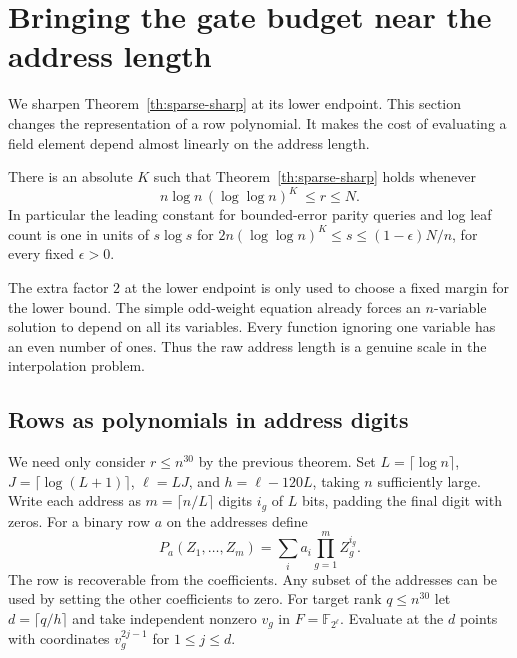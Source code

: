 \section{Bringing the gate budget near the address length}
We sharpen Theorem~\ref{th:sparse-sharp} at its lower endpoint. This section changes the representation of a row polynomial. It makes the cost of evaluating a field element depend almost linearly on the address length.

\begin{theorem}\label{th:near}
There is an absolute $K$ such that Theorem~\ref{th:sparse-sharp} holds whenever
\[
             n\log n\,(\log\log n)^K\ \le r\le N .
\]
In particular the leading constant for bounded-error parity queries and log leaf count is one in units of $s\log s$ for $2n(\log\log n)^K\le s\le(1-\epsilon)N/n$, for every fixed $\epsilon>0$.
\end{theorem}
The extra factor $2$ at the lower endpoint is only used to choose a fixed margin for the lower bound. The simple odd-weight equation already forces an $n$-variable solution to depend on all its variables. Every function ignoring one variable has an even number of ones. Thus the raw address length is a genuine scale in the interpolation problem.

\subsection{Rows as polynomials in address digits}
We need only consider $r\le n^{30}$ by the previous theorem. Set $L=\lceil\log n\rceil$, $J=\lceil\log(L+1)\rceil$, $\ell=LJ$, and $h=\ell-120L$, taking $n$ sufficiently large. Write each address as $m=\lceil n/L\rceil$ digits $i_g$ of $L$ bits, padding the final digit with zeros. For a binary row $a$ on the addresses define
\[
              P_a(Z_1,\ldots,Z_m)=\sum_i a_i\prod_{g=1}^m Z_g^{i_g}.
\]
The row is recoverable from the coefficients. Any subset of the addresses can be used by setting the other coefficients to zero. For target rank $q\le n^{30}$ let $d=\lceil q/h\rceil$ and take independent nonzero $v_g$ in $F=\mathbb F_{2^\ell}$. Evaluate at the $d$ points with coordinates $v_g^{2j-1}$ for $1\le j\le d$.

